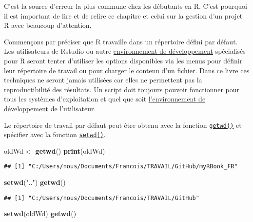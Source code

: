 \documentclass[]{book}
\newenvironment{Shaded}{\begin{snugshade}}{\end{snugshade}}
\newcommand{\KeywordTok}[1]{\textcolor[rgb]{0.13,0.29,0.53}{\textbf{#1}}}
\newcommand{\StringTok}[1]{\textcolor[rgb]{0.31,0.60,0.02}{#1}}
\newcommand{\NormalTok}[1]{#1}
\theoremstyle{definition}
\theoremstyle{definition}
\theoremstyle{definition}
\theoremstyle{remark}
\begin{document}
C'est la source d'erreur la plus commune chez les débutants en R. C'est
pourquoi il est important de lire et de relire ce chapitre et celui sur
la gestion d'un projet R avec beaucoup d'attention.

Commençons par préciser que R travaille dans un répertoire défini par
défaut. Les utilisateurs de Rstudio ou autre
\protect\hyperlink{IDE}{environnement de développement} spécialisés pour
R seront tenter d'utiliser les options disponibles via les menus pour
définir leur répertoire de travail ou pour charger le contenu d'un
fichier. Dans ce livre ces techniques ne seront jamais utilisées car
elles ne permettent pas la reproductibilité des résultats. Un script
doit toujours pouvoir fonctionner pour tous les systèmes d'exploitation
et quel que soit \protect\hyperlink{IDE}{l'environnement de
développement} de l'utilisateur.

Le répertoire de travail par défaut peut être obtenu avec la fonction
\protect\hyperlink{l015getwd}{\texttt{getwd()}} et spécifier avec la
fonction \protect\hyperlink{l015setwd}{\texttt{setwd()}}.

\begin{Shaded}
\begin{Highlighting}[]
\NormalTok{oldWd <-}\StringTok{ }\KeywordTok{getwd}\NormalTok{()}
\KeywordTok{print}\NormalTok{(oldWd)}
\end{Highlighting}
\end{Shaded}

\begin{verbatim}
## [1] "C:/Users/nous/Documents/Francois/TRAVAIL/GitHub/myRBook_FR"
\end{verbatim}

\begin{Shaded}
\begin{Highlighting}[]
\KeywordTok{setwd}\NormalTok{(}\StringTok{".."}\NormalTok{)}
\KeywordTok{getwd}\NormalTok{()}
\end{Highlighting}
\end{Shaded}

\begin{verbatim}
## [1] "C:/Users/nous/Documents/Francois/TRAVAIL/GitHub"
\end{verbatim}

\begin{Shaded}
\begin{Highlighting}[]
\KeywordTok{setwd}\NormalTok{(oldWd)}
\KeywordTok{getwd}\NormalTok{()}
\end{Highlighting}
\end{Shaded}
\end{document}
